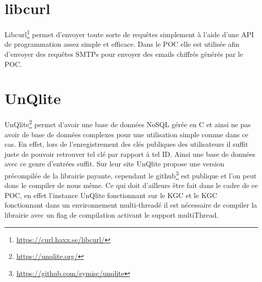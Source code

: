 \section{libcurl}
Libcurl\footnote{\url{https://curl.haxx.se/libcurl/}} permet d'envoyer toute sorte de requêtes simplement à l'aide d'une API de programmation assez simple et efficace. Dans le POC elle est utilisée afin d'envoyer des requêtes SMTPs pour envoyer des emails chiffrés générés par le POC.
\section{UnQlite}
UnQlite\footnote{\url{https://unqlite.org/}} permet d'avoir une base de données NoSQL gérée en C et ainsi ne pas avoir de base de données complexes pour une utilisation simple comme dans ce cas. En effet, lors de l'enregistrement des clés publiques des utilisateurs il suffit juste de pouvoir retrouver tel clé par rapport à tel ID. Ainsi une base de données avec ce genre d'entrées suffit. Sur leur site UnQlite propose une version précompilée de la librairie payante, cependant le github\footnote{\url{https://github.com/symisc/unqlite}} est publique et l'on peut donc le compiler de nous même. Ce qui doit d'ailleurs être fait dans le cadre de ce POC, en effet l'instance UnQlite fonctionnant sur le KGC et le KGC fonctionnant dans un environnement multi-threadé il est nécessaire de compiler la librairie avec un flag de compilation activant le support multiThread.